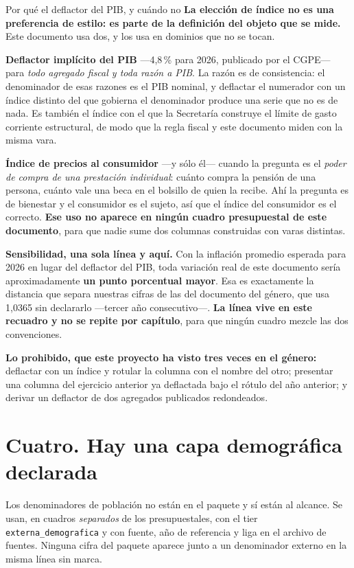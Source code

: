 \begin{recuadro}{Por qué el deflactor del PIB, y cuándo no}
\textbf{La elección de índice no es una preferencia de estilo: es parte de la definición del
objeto que se mide.} Este documento usa dos, y los usa en dominios que no se tocan.

\textbf{Deflactor implícito del PIB} ---4,8\,\% para 2026, publicado por el CGPE--- para
\emph{todo agregado fiscal y toda razón a PIB}. La razón es de consistencia: el denominador de
esas razones es el PIB nominal, y deflactar el numerador con un índice distinto del que
gobierna el denominador produce una serie que no es de nada. Es también el índice con el que
la Secretaría construye el límite de gasto corriente estructural, de modo que la regla fiscal
y este documento miden con la misma vara.

\textbf{Índice de precios al consumidor} ---y sólo él--- cuando la pregunta es el
\emph{poder de compra de una prestación individual}: cuánto compra la pensión de una persona,
cuánto vale una beca en el bolsillo de quien la recibe. Ahí la pregunta es de bienestar y el
consumidor es el sujeto, así que el índice del consumidor es el correcto. \textbf{Ese uso no
aparece en ningún cuadro presupuestal de este documento}, para que nadie sume dos columnas
construidas con varas distintas.

\textbf{Sensibilidad, una sola línea y aquí.} Con la inflación promedio esperada para 2026 en
lugar del deflactor del PIB, toda variación real de este documento sería aproximadamente
\textbf{un punto porcentual mayor}. Esa es exactamente la distancia que separa nuestras
cifras de las del documento del género, que usa 1,0365 sin declararlo ---tercer año
consecutivo---. \textbf{La línea vive en este recuadro y no se repite por capítulo}, para que
ningún cuadro mezcle las dos convenciones.

\textbf{Lo prohibido, que este proyecto ha visto tres veces en el género:} deflactar con un
índice y rotular la columna con el nombre del otro; presentar una columna del ejercicio
anterior ya deflactada bajo el rótulo del año anterior; y derivar un deflactor de dos
agregados publicados redondeados.
\end{recuadro}

\section*{Cuatro. Hay una capa demográfica declarada}

Los denominadores de población no están en el paquete y sí están al alcance. Se usan, en
cuadros \emph{separados} de los presupuestales, con el tier \texttt{externa\_demografica} y
con fuente, año de referencia y liga en el archivo de fuentes. Ninguna cifra del paquete
aparece junto a un denominador externo en la misma línea sin marca.

